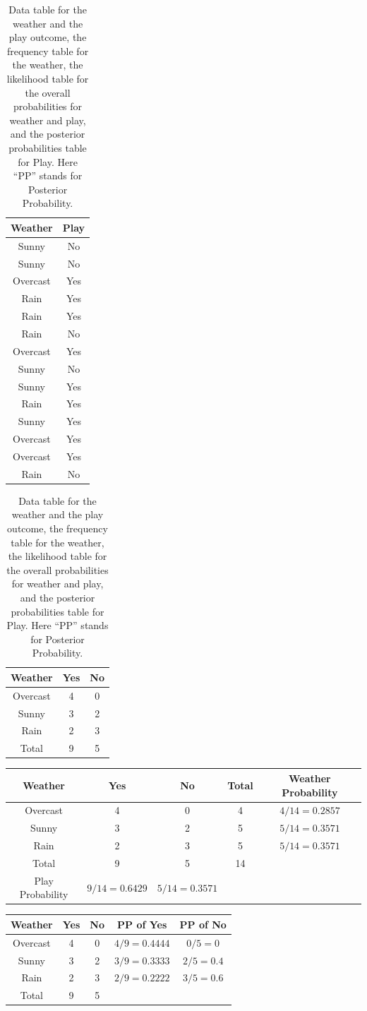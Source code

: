 \documentclass[12pt,twoside]{report}   %
\begin{document}
\begin{table}[H]
  \centering
  \caption{Data table for the weather and the play outcome, the frequency table for the weather, the likelihood table for the overall probabilities for weather and play, and the posterior probabilities table for Play. Here ``PP'' stands for Posterior Probability.}
  \label{tab:play}
    \begin{tabular}{|c|c|}
    \hline
    Weather & Play \\
\hline
Sunny & No\\
Sunny & No\\ 
Overcast & Yes\\
Rain & Yes\\
Rain & Yes\\
Rain & No\\
Overcast & Yes\\
Sunny & No\\
Sunny & Yes\\
Rain & Yes\\
Sunny & Yes\\
Overcast & Yes\\
Overcast & Yes\\
Rain & No\\
    \hline
  \end{tabular}
  \quad
  \begin{tabular}{|c|c|c|}
    \hline
    Weather & Yes & No \\
\hline
Overcast & 4 & 0\\
Sunny & 3 & 2\\ 
Rain & 2 & 3\\
\hline
Total & 9 & 5\\
    \hline
  \end{tabular}
\end{table}
\begin{table}[H]
  \centering
  \begin{tabular}{|c|c|c|c|c|}
    \hline
    Weather & Yes & No & Total & Weather Probability\\
\hline
Overcast & 4 & 0 & 4 & $4/14=0.2857$\\
Sunny & 3 & 2 & 5 & $5/14=0.3571$\\ 
Rain & 2 & 3 & 5 & $5/14=0.3571$\\
\hline
Total & 9 & 5 & 14 &\\
\hline
Play Probability & $9/14=0.6429$ & $5/14=0.3571$ &&\\
    \hline
  \end{tabular}
\end{table}
\begin{table}[H]
  \centering
  \begin{tabular}{|c|c|c|c|c|}
    \hline
    Weather & Yes & No & PP of Yes & PP of No\\
\hline
Overcast & 4 & 0 & $4/9=0.4444$ & $0/5=0$\\
Sunny & 3 & 2 & $3/9=0.3333$ & $2/5=0.4$\\ 
Rain & 2 & 3 & $2/9=0.2222$ & $3/5=0.6$\\
\hline
Total & 9 & 5 &&\\
    \hline
  \end{tabular}
\end{table}
\end{document}
